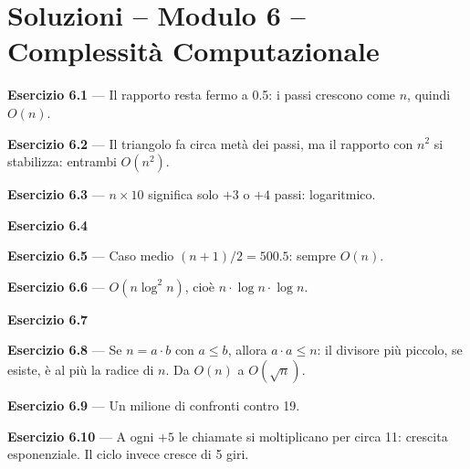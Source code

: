 \chapter{Soluzioni -- Modulo 6 -- Complessità Computazionale}
\textbf{Esercizio 6.1} --- Il rapporto resta fermo a 0.5: i passi crescono come $n$,
quindi $O(n)$.

\textbf{Esercizio 6.2} --- Il triangolo fa circa metà dei passi, ma il rapporto con
$n^2$ si stabilizza: entrambi $O(n^2)$.

\textbf{Esercizio 6.3} --- $n \times 10$ significa solo $+3$ o $+4$ passi:
logaritmico.

\textbf{Esercizio 6.4}

\textbf{Esercizio 6.5} --- Caso medio $(n+1)/2 = 500.5$: sempre $O(n)$.

\textbf{Esercizio 6.6} --- $O(n \log^2 n)$, cioè $n \cdot \log n \cdot \log n$.

\textbf{Esercizio 6.7}

\textbf{Esercizio 6.8} --- Se $n = a \cdot b$ con $a \le b$, allora $a \cdot a \le n$:
il divisore più piccolo, se esiste, è al più la radice di $n$. Da $O(n)$ a
$O(\sqrt{n})$.

\textbf{Esercizio 6.9} --- Un milione di confronti contro 19.

\textbf{Esercizio 6.10} --- A ogni $+5$ le chiamate si moltiplicano per circa 11:
crescita esponenziale. Il ciclo invece cresce di 5 giri.

